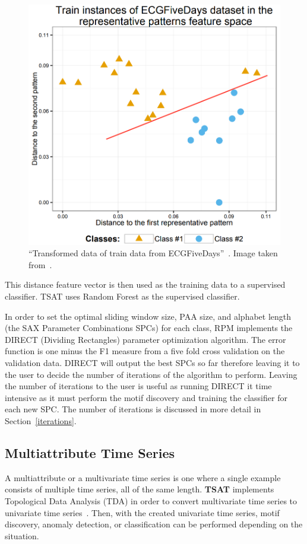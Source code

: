 \documentclass[titlepage, letterpaper, 12pt]{article}
\newcommand\TSAT{\textbf{TSAT}}
\begin{document}
\begin{figure}[H]
	\centering
	\includegraphics[width=.7\textwidth]{pictures/featurevec}
	\caption{``Transformed data of train data from ECGFiveDays''~\cite{wang2016rpm}.  Image taken from~\cite{wang2016rpm}.}
	\label{fig:featurevec}
\end{figure}


This distance feature vector is then used as the training data to a supervised classifier. TSAT uses Random Forest as the supervised classifier.

In order to set the optimal sliding window size, PAA size, and alphabet length (the SAX Parameter Combinations SPCs) for each class, RPM implements the DIRECT (Dividing Rectangles) parameter optimization algorithm.  The error function is one minus the F1 measure from a five fold cross validation on the validation data.  DIRECT will output the best SPCs so far therefore leaving it to the user to decide the number of iterations of the algorithm to perform.  Leaving the number of iterations to the user is useful as running DIRECT it time intensive as it must perform the motif discovery and training the classifier for each new SPC.  The number of iterations is discussed in more detail in Section~\ref{iterations}.

\subsection{Multiattribute Time Series}
A multiattribute or a multivariate time series is one where a single example consists of multiple time series, all of the same length.  {\TSAT} implements Topological Data Analysis (TDA) in order to convert multivariate time series to univariate time series~\cite{gidea2018topological,chazal2017introduction,Seversky2016OnTT}.  Then, with the created univariate time series, motif discovery, anomaly detection, or classification can be performed depending on the situation.
\end{document}
